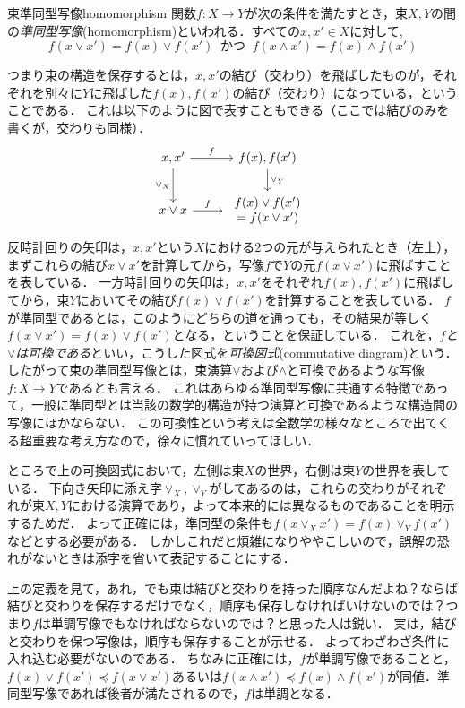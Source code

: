 \documentclass[11pt,a4paper, dvipdfmx]{jsarticle}
\begin{document}
\begin{dfn}{束準同型写像}{homomorphism}
関数$f:X \to Y$が次の条件を満たすとき，束$X, Y$の間の\emph{準同型写像}(homomorphism)といわれる．すべての$x, x' \in X$に対して, 
\[
 f(x \vee x') = f(x) \vee f(x') \ \text{ かつ } \ f(x \wedge x') = f(x) \wedge f(x')
\]
\end{dfn}
つまり束の構造を保存するとは，$x, x'$の結び（交わり）を飛ばしたものが，それぞれを別々に$Y$に飛ばした$f(x), f(x')$の結び（交わり）になっている，ということである．
これは以下のように図で表すこともできる（ここでは結びのみを書くが，交わりも同様）．
\[
\begin{tikzcd}
x, x' \arrow{r}{f} \arrow[swap]{d}{\vee_X} 
& f(x), f(x') \arrow{d}{\vee_Y} \\
x \vee x \arrow{r}{f} 
& \begin{array}{c} f(x) \vee f(x') \\ = f(x \vee x') \end{array}
\end{tikzcd}
\]
反時計回りの矢印は，$x, x'$という$X$における2つの元が与えられたとき（左上），まずこれらの結び$x \vee x'$を計算してから，写像$f$で$Y$の元$f(x \vee x')$に飛ばすことを表している．
一方時計回りの矢印は，$x, x'$をそれぞれ$f(x), f(x')$に飛ばしてから，束$Y$においてその結び$f(x) \vee f(x')$を計算することを表している．
$f$が準同型であるとは，このようにどちらの道を通っても，その結果が等しく$f(x \vee x') = f(x) \vee f(x')$となる，ということを保証している．
これを，\emph{$f$と$\vee$は可換である}といい，こうした図式を\emph{可換図式}(commutative diagram)という．
したがって束の準同型写像とは，束演算$\vee$および$\wedge$と可換であるような写像$f:X \to Y$であるとも言える．
これはあらゆる準同型写像に共通する特徴であって，一般に準同型とは当該の数学的構造が持つ演算と可換であるような構造間の写像にほかならない．
この可換性という考えは全数学の様々なところで出てくる超重要な考え方なので，徐々に慣れていってほしい．

ところで上の可換図式において，左側は束$X$の世界，右側は束$Y$の世界を表している．
下向き矢印に添え字$\vee_X, \vee_Y$がしてあるのは，これらの交わりがそれぞれが束$X, Y$における演算であり，よって本来的には異なるものであることを明示するためだ．
よって正確には，準同型の条件も$f(x \vee_X x') = f(x) \vee_Y f(x')$などとする必要がある．
しかしこれだと煩雑になりややこしいので，誤解の恐れがないときは添字を省いて表記することにする．

\begin{attn}
上の定義を見て，あれ，でも束は結びと交わりを持った順序なんだよね？ならば結びと交わりを保存するだけでなく，順序も保存しなければいけないのでは？つまり$f$は単調写像でもなければならないのでは？と思った人は鋭い．
実は，結びと交わりを保つ写像は，順序も保存することが示せる．
よってわざわざ条件に入れ込む必要がないのである．
ちなみに正確には，$f$が単調写像であることと，$f(x) \vee f(x') \preceq f (x \vee x')$あるいは$f(x \wedge x') \preceq f(x) \wedge f(x')$が同値．準同型写像であれば後者が満たされるので，$f$は単調となる．
\end{attn}
\end{document}
